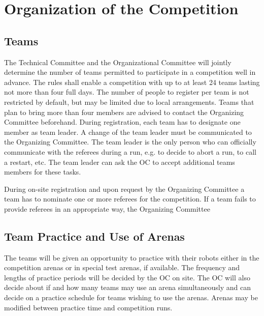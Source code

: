 
\section{Organization of the Competition}\label{sec:participation_in_the_competition}

\subsection{Teams}
The Technical Committee and the Organizational Committee will jointly determine the number of teams permitted to participate in a competition well in advance. The rules shall enable a competition with up to at least 24 teams lasting not more than four full days.
The number of people to register per team is not restricted by default, but may be limited due to local arrangements. Teams that plan to bring more than four members are advised to contact the Organizing Committee beforehand.
During registration, each team has to designate one member as team leader. A change of the team leader must be communicated to the Organizing Committee. The team leader is the only person who can officially communicate with the referees during a run, e.g. to decide to abort a run, to call a restart, etc. The team leader can ask the OC to accept additional teams members for these tasks.
\par
During on-site registration and upon request by the Organizing Committee a team has to nominate one or more referees for the competition. If a team fails to provide referees in an appropriate way, the Organizing Committee 


\subsection{Team Practice and Use of Arenas}
The teams will be given an opportunity to practice with their robots either in the competition arenas or in special test arenas, if available. The frequency and lengths of practice periods will be decided by the OC on site. The OC will also decide about if and how many teams may use an arena simultaneously and can decide on a practice schedule for teams wishing to use the arenas. Arenas may be modified between practice time and competition runs.

